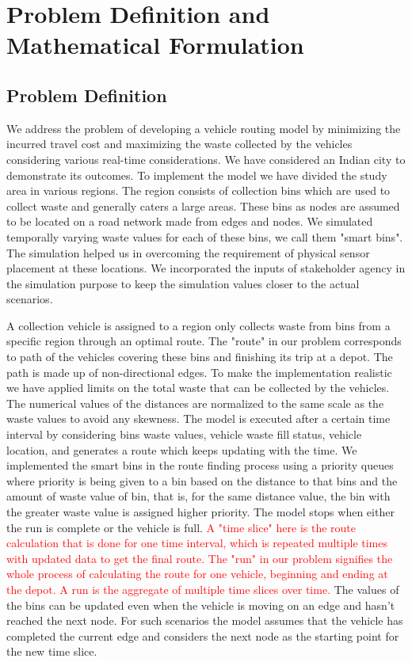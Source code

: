 \documentclass[12pt]{article}
\begin{document}
\section{Problem Definition and Mathematical Formulation}


\subsection{Problem Definition}
We address the problem of developing a vehicle routing model by minimizing the incurred travel cost and maximizing the waste collected by the vehicles considering various real-time considerations. We have considered an Indian city to demonstrate its outcomes. To implement the model we have divided the study area in various regions. The region consists of collection bins which are used to collect waste and generally caters a large areas. These bins as nodes are assumed to be located on a road network made from edges and nodes. We simulated temporally varying waste values for each of these bins, we call them "smart bins". The simulation helped us in overcoming the requirement of physical sensor placement at these locations. We incorporated the inputs of stakeholder agency in the simulation purpose to keep the simulation values closer to the actual scenarios. 
	
A collection vehicle is assigned to a region only collects waste from bins from a specific region through an optimal route.  The "route" in our problem corresponds to path of the vehicles covering these bins and finishing its trip at a depot. The path is made up of  non-directional edges. To make the implementation realistic we have applied limits on the total waste that can be collected by the vehicles. 
The numerical values of the distances are normalized to the same scale as the waste values to avoid any skewness. The model is executed after a certain time interval by considering  bins waste values, vehicle waste fill status, vehicle location,  and generates a route which keeps updating with the time. We implemented the smart bins in the route finding process using a priority queues where priority is being given to a bin based on the distance to that bins and the amount of waste value of bin, that is, for the same distance value, the bin with the greater waste value is assigned higher priority. The model stops when either the run is complete or the vehicle is full. \textcolor{red}{A "time slice" here is the route calculation that is done for one time interval, which is repeated multiple times with updated data to get the final route. The "run" in our problem signifies the whole process of calculating the route for one vehicle, beginning and ending at the depot. A run is the aggregate of multiple time slices over time.} The values of the bins can be updated even when the vehicle is moving on an edge and hasn't reached the next node. For such scenarios the model assumes that the vehicle has completed the current edge and considers the next node as the starting point for the new time slice.
\end{document}
